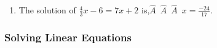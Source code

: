 {\begin{mdframed}[linewidth=4, leftmargin=40, rightmargin=40]
\begin{exercise}
\begin{enumerate}[noitemsep, label=\textbf{Step} \textbf{\arabic*}. ]
        
        \label{m39241*id148292}Since both sides are equal to \begin{math}\frac{-134}{17}\end{math}, the answer is correct.\par 
        \item  
        \label{m39241*id148321}The solution of \begin{math}\frac{4}{3}x-6=7x+2\end{math} is,\ensuremath{\hat{A}}~\ensuremath{\hat{A}}~\ensuremath{\hat{A}}~\begin{math}x=\frac{-24}{17}\end{math}.
 \par 
        \end{enumerate}
         

    \end{exercise}
    \end{mdframed}
    }
    \noindent
  
\label{m39241*secfhsst!!!underscore!!!id1862}
            \subsubsection{  Solving Linear Equations }
            \nopagebreak
            
